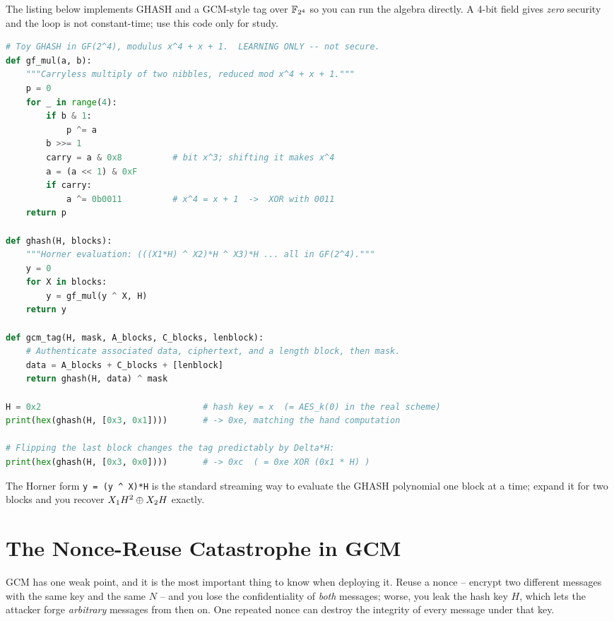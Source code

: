 \begin{implementbox}
The listing below implements GHASH and a GCM-style tag over $\mathbb{F}_{2^4}$ so you can run the algebra directly. A 4-bit field gives \emph{zero} security and the loop is not constant-time; use this code only for study.
\begin{lstlisting}[language=Python]
# Toy GHASH in GF(2^4), modulus x^4 + x + 1.  LEARNING ONLY -- not secure.
def gf_mul(a, b):
    """Carryless multiply of two nibbles, reduced mod x^4 + x + 1."""
    p = 0
    for _ in range(4):
        if b & 1:
            p ^= a
        b >>= 1
        carry = a & 0x8          # bit x^3; shifting it makes x^4
        a = (a << 1) & 0xF
        if carry:
            a ^= 0b0011          # x^4 = x + 1  ->  XOR with 0011
    return p

def ghash(H, blocks):
    """Horner evaluation: (((X1*H) ^ X2)*H ^ X3)*H ... all in GF(2^4)."""
    y = 0
    for X in blocks:
        y = gf_mul(y ^ X, H)
    return y

def gcm_tag(H, mask, A_blocks, C_blocks, lenblock):
    # Authenticate associated data, ciphertext, and a length block, then mask.
    data = A_blocks + C_blocks + [lenblock]
    return ghash(H, data) ^ mask

H = 0x2                                # hash key = x  (= AES_k(0) in the real scheme)
print(hex(ghash(H, [0x3, 0x1])))       # -> 0xe, matching the hand computation

# Flipping the last block changes the tag predictably by Delta*H:
print(hex(ghash(H, [0x3, 0x0])))       # -> 0xc  ( = 0xe XOR (0x1 * H) )
\end{lstlisting}
The Horner form \texttt{y = (y \^{} X)*H} is the standard streaming way to evaluate the GHASH polynomial one block at a time; expand it for two blocks and you recover $X_1 H^2 \oplus X_2 H$ exactly.
\end{implementbox}

\section{The Nonce-Reuse Catastrophe in GCM}
\label{ch16:gcm-nonce-reuse}

GCM has one weak point, and it is the most important thing to know when deploying it. Reuse a nonce -- encrypt two different messages with the same key and the same $N$ -- and you lose the confidentiality of \emph{both} messages; worse, you leak the hash key $H$, which lets the attacker forge \emph{arbitrary} messages from then on. One repeated nonce can destroy the integrity of every message under that key.

